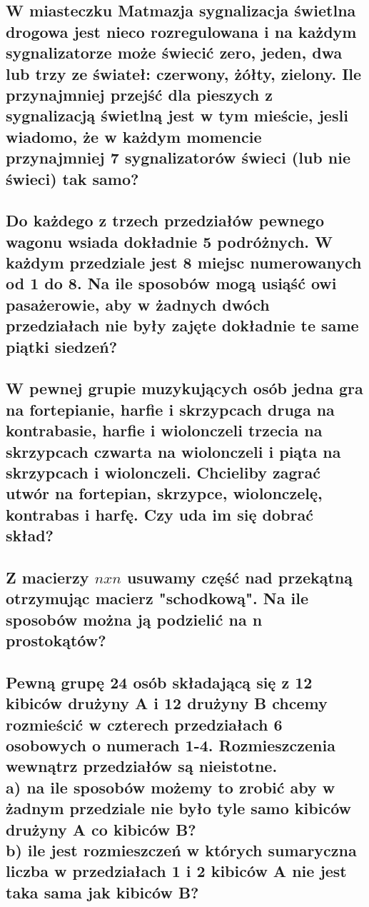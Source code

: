 \documentclass[12pt]{article}
\begin{document}
\subsection{W miasteczku Matmazja sygnalizacja świetlna drogowa jest nieco rozregulowana i na każdym sygnalizatorze może świecić zero, jeden, dwa lub trzy ze świateł: czerwony, żółty, zielony. Ile przynajmniej przejść dla pieszych z sygnalizacją świetlną jest w tym mieście, jesli wiadomo, że w każdym momencie przynajmniej 7 sygnalizatorów świeci (lub nie świeci) tak samo?}

\subsection{Do każdego z trzech przedziałów pewnego wagonu wsiada dokładnie 5 podróżnych. W każdym przedziale jest 8 miejsc numerowanych od 1 do 8. Na ile sposobów mogą usiąść owi pasażerowie, aby w żadnych dwóch przedziałach nie były zajęte dokładnie te same piątki siedzeń?}

\subsection{W pewnej grupie muzykujących osób jedna gra na fortepianie, harfie i skrzypcach druga na kontrabasie, harfie i wiolonczeli trzecia na skrzypcach czwarta na wiolonczeli i piąta na skrzypcach i wiolonczeli. Chcieliby zagrać utwór na fortepian, skrzypce, wiolonczelę, kontrabas i harfę. Czy uda im się dobrać skład?}

\subsection{Z macierzy $n x n$ usuwamy część nad przekątną otrzymując macierz "schodkową". Na ile sposobów można ją podzielić na n prostokątów?}


\newpage

\subsection{Pewną grupę 24 osób składającą się z 12 kibiców drużyny A i 12 drużyny B chcemy rozmieścić w czterech przedziałach 6 osobowych o numerach 1-4. Rozmieszczenia wewnątrz przedziałów są nieistotne. \\ a) na ile sposobów możemy to zrobić aby w żadnym przedziale nie było tyle samo kibiców drużyny A co kibiców B? \\b) ile jest rozmieszczeń w których sumaryczna liczba w przedziałach 1 i 2 kibiców A nie jest taka sama jak kibiców B?}
\end{document}
